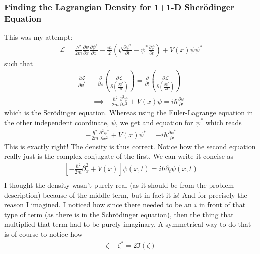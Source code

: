 \documentclass[a4paper]{article}
\begin{document}
    \subsubsection{Finding the Lagrangian Density for 1+1-D Shcrödinger Equation}
    This was my attempt: \begin{align*}
        \mathcal{L} = \frac{\hbar^{2} }{2m}\frac{\partial \psi }{\partial x}\frac{\partial \psi^{\ast}}{\partial x}  - \frac{i\hbar}{2}\left( \psi \frac{\partial \psi ^{\ast} }{\partial t}  - \psi ^{\ast} \frac{\partial \psi }{\partial t} \right) + V(x) \psi \psi ^{\ast} 
    \end{align*}
    such that \begin{align*}
        \frac{\partial \mathcal{L} }{\partial \psi^{\ast} } &- \frac{\partial}{\partial x}  \left( \frac{\partial \mathcal{L} }{\partial \left( \frac{\partial \psi ^{\ast} }{\partial x}  \right) }  \right) = \frac{\partial }{\partial t} \left( \frac{\partial \mathcal{L} }{\partial \left( \frac{\partial \psi ^{\ast} }{\partial t}  \right) }  \right) \\
        &\implies -\frac{\hbar^{2} }{2m} \frac{\partial^{2}  \psi}{\partial x^{2} } + V(x) \psi = i \hbar \frac{\partial \psi }{\partial t}   
    \end{align*}
    which is the Scrödinger equation. Whereas using the Euler-Lagrange equation in the other independent coordinate, \(\psi\), we get and equation for \(\psi ^{\ast} \) which reads \begin{align*}
        -\frac{\hbar^{2} }{2m} \frac{\partial^{2}  \psi^{\ast} }{\partial x^{2} } + V(x) \psi^{\ast}  = -i \hbar \frac{\partial \psi^{\ast}  }{\partial t} 
    \end{align*} 
    This is exactly right! The density is thus correct. Notice how the second equation really just is the complex conjugate of the first. We can write it concise as \begin{align*}
        \left[ -\frac{\hbar^{2} }{2m}\partial_x ^{2} + V(x) \right]\psi (x, t) = i \hbar \partial _t \psi(x, t) \tag{1}\\
    \end{align*}
    I thought the density wasn't purely real (as it should be from the problem description) because of the middle term, but in fact it is! And for precisely the reason I imagined. I noticed how since there needed to be an \(i\) in front of that type of term (as there is in the Schrödinger equation), then the thing that multiplied that term had to be purely imaginary. A symmetrical way to do that is of course to notice how \begin{align*}
        \zeta - \zeta ^{\ast} = 2 \Im(\zeta)
    \end{align*}
\end{document}
